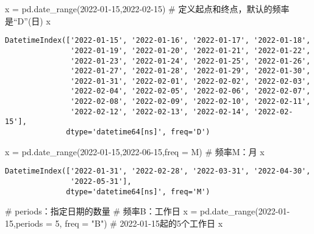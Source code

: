 \documentclass[
  letterpaper,
  DIV=11,
  numbers=noendperiod]{scrreprt}
\newenvironment{Shaded}{\begin{snugshade}}{\end{snugshade}}
\newcommand{\CommentTok}[1]{\textcolor[rgb]{0.37,0.37,0.37}{#1}}
\newcommand{\DecValTok}[1]{\textcolor[rgb]{0.68,0.00,0.00}{#1}}
\newcommand{\NormalTok}[1]{\textcolor[rgb]{0.00,0.23,0.31}{#1}}
\newcommand{\OperatorTok}[1]{\textcolor[rgb]{0.37,0.37,0.37}{#1}}
\newcommand{\StringTok}[1]{\textcolor[rgb]{0.13,0.47,0.30}{#1}}
\begin{document}
\begin{Shaded}
\begin{Highlighting}[]
\NormalTok{x }\OperatorTok{=}\NormalTok{ pd.date\_range(}\StringTok{\textquotesingle{}2022{-}01{-}15\textquotesingle{}}\NormalTok{,}\StringTok{\textquotesingle{}2022{-}02{-}15\textquotesingle{}}\NormalTok{) }\CommentTok{\# 定义起点和终点，默认的频率是“D”(日)}
\NormalTok{x}
\end{Highlighting}
\end{Shaded}

\begin{verbatim}
DatetimeIndex(['2022-01-15', '2022-01-16', '2022-01-17', '2022-01-18',
               '2022-01-19', '2022-01-20', '2022-01-21', '2022-01-22',
               '2022-01-23', '2022-01-24', '2022-01-25', '2022-01-26',
               '2022-01-27', '2022-01-28', '2022-01-29', '2022-01-30',
               '2022-01-31', '2022-02-01', '2022-02-02', '2022-02-03',
               '2022-02-04', '2022-02-05', '2022-02-06', '2022-02-07',
               '2022-02-08', '2022-02-09', '2022-02-10', '2022-02-11',
               '2022-02-12', '2022-02-13', '2022-02-14', '2022-02-15'],
              dtype='datetime64[ns]', freq='D')
\end{verbatim}

\begin{Shaded}
\begin{Highlighting}[]
\NormalTok{x }\OperatorTok{=}\NormalTok{ pd.date\_range(}\StringTok{\textquotesingle{}2022{-}01{-}15\textquotesingle{}}\NormalTok{,}\StringTok{\textquotesingle{}2022{-}06{-}15\textquotesingle{}}\NormalTok{,freq }\OperatorTok{=} \StringTok{\textquotesingle{}M\textquotesingle{}}\NormalTok{) }\CommentTok{\# 频率M：月}
\NormalTok{x}
\end{Highlighting}
\end{Shaded}

\begin{verbatim}
DatetimeIndex(['2022-01-31', '2022-02-28', '2022-03-31', '2022-04-30',
               '2022-05-31'],
              dtype='datetime64[ns]', freq='M')
\end{verbatim}

\begin{Shaded}
\begin{Highlighting}[]
\CommentTok{\# periods：指定日期的数量}
\CommentTok{\# 频率B：工作日}
\NormalTok{x }\OperatorTok{=}\NormalTok{ pd.date\_range(}\StringTok{\textquotesingle{}2022{-}01{-}15\textquotesingle{}}\NormalTok{,periods }\OperatorTok{=} \DecValTok{5}\NormalTok{, freq }\OperatorTok{=} \StringTok{"B"}\NormalTok{) }\CommentTok{\# 2022{-}01{-}15起的5个工作日}
\NormalTok{x}
\end{Highlighting}
\end{Shaded}
\end{document}
